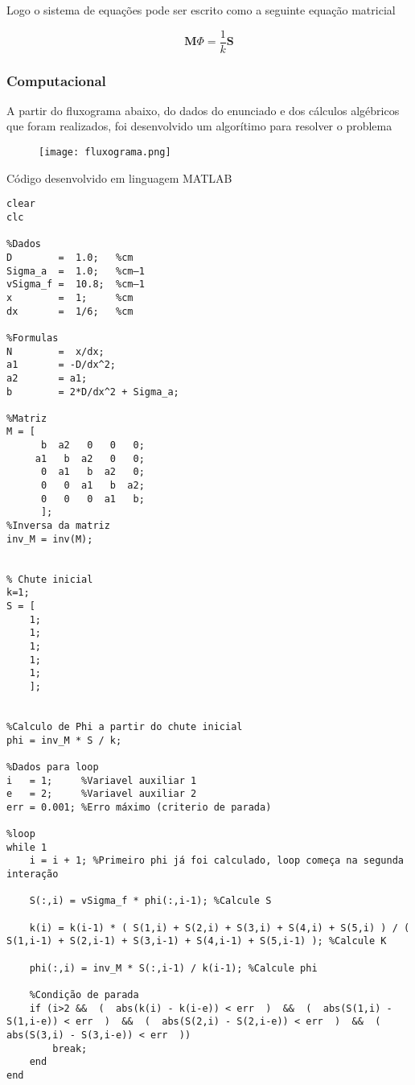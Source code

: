 \documentclass{article}
\begin{document}
                Logo o sistema de equações pode ser escrito como a seguinte equação matricial

                \begin{equation}
                    \textbf{M}\Phi = \frac{1}{k}\textbf{S} 
                \end{equation}
                
                
            \subsubsection{Computacional}
            
                A partir do fluxograma abaixo, do dados do enunciado e dos cálculos algébricos que foram realizados, foi desenvolvido um algorítimo para resolver o problema
                \begin{figure}[H]
                    \centering
                    \texttt{[image: fluxograma.png]}
                    \centering 
                    \label{nuclelink_fechado}
                \end{figure}
            
                Código desenvolvido em linguagem MATLAB
                \begin{lstlisting}
clear
clc

%Dados
D        =  1.0;   %cm
Sigma_a  =  1.0;   %cm–1
vSigma_f =  10.8;  %cm–1
x        =  1;     %cm
dx       =  1/6;   %cm

%Formulas
N        =  x/dx;
a1       = -D/dx^2;
a2       = a1;
b        = 2*D/dx^2 + Sigma_a;

%Matriz
M = [
      b  a2   0   0   0;
     a1   b  a2   0   0;
      0  a1   b  a2   0;
      0   0  a1   b  a2;
      0   0   0  a1   b;
      ];
%Inversa da matriz
inv_M = inv(M);


% Chute inicial
k=1;
S = [
    1;
    1;
    1;
    1;
    1;
    ];


%Calculo de Phi a partir do chute inicial
phi = inv_M * S / k;

%Dados para loop
i   = 1;     %Variavel auxiliar 1
e   = 2;     %Variavel auxiliar 2
err = 0.001; %Erro máximo (criterio de parada)

%loop
while 1
    i = i + 1; %Primeiro phi já foi calculado, loop começa na segunda interação

    S(:,i) = vSigma_f * phi(:,i-1); %Calcule S
    
    k(i) = k(i-1) * ( S(1,i) + S(2,i) + S(3,i) + S(4,i) + S(5,i) ) / ( S(1,i-1) + S(2,i-1) + S(3,i-1) + S(4,i-1) + S(5,i-1) ); %Calcule K
    
    phi(:,i) = inv_M * S(:,i-1) / k(i-1); %Calcule phi
    
    %Condição de parada
    if (i>2 &&  (  abs(k(i) - k(i-e)) < err  )  &&  (  abs(S(1,i) - S(1,i-e)) < err  )  &&  (  abs(S(2,i) - S(2,i-e)) < err  )  &&  (  abs(S(3,i) - S(3,i-e)) < err  ))
        break;
    end
end
                \end{lstlisting}
\end{document}
